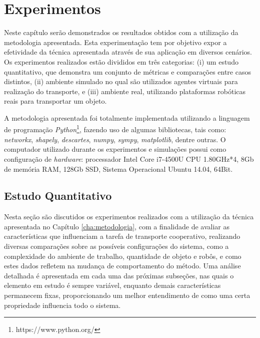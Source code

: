 \chapter{Experimentos} %
\label{cha:experimentos}

Neste capítulo serão demonstrados os resultados obtidos com a utilização da metodologia apresentada.
Esta experimentação tem por objetivo expor a efetividade da técnica apresentada através de sua aplicação em diversos cenários.
Os experimentos realizados estão divididos em três categorias:
(i) um estudo quantitativo, que demonstra um conjunto de métricas e comparações entre casos distintos,
(ii) ambiente simulado no qual são utilizados agentes virtuais para realização do transporte, e
(iii) ambiente real, utilizando plataformas robóticas reais para transportar um objeto.

A metodologia apresentada foi totalmente implementada utilizando a linguagem de programação \emph{Python}\footnote{https://www.python.org/}, fazendo uso de algumas bibliotecas, tais como: \emph{networkx}, \emph{shapely}, \emph{descartes}, \emph{numpy}, \emph{sympy}, \emph{matplotlib}, dentre outras.
O computador utilizado durante os experimentos e simulações possui como configuração de \emph{hardware}: processador Intel Core i7-4500U CPU 1.80GHz*4, 8Gb de memória RAM, 128Gb SSD, Sistema Operacional Ubuntu 14.04, 64Bit.

\newpage



\section{Estudo Quantitativo} %
\label{sec:estudo_quantitativo}

Nesta seção são discutidos os experimentos realizados com a utilização da técnica apresentada no Capítulo \ref{cha:metodologia}, com a finalidade de avaliar as características que influenciam a tarefa de transporte cooperativo, realizando diversas comparações sobre as possíveis configurações do sistema, como a complexidade do ambiente de trabalho, quantidade de objeto e robôs, e como estes dados refletem na mudança de comportamento do método.
Uma análise detalhada é apresentada em cada uma das próximas subseções, nas quais o elemento em estudo é sempre variável, enquanto demais características permanecem fixas, proporcionando um melhor entendimento de como uma certa propriedade influencia todo o sistema.

